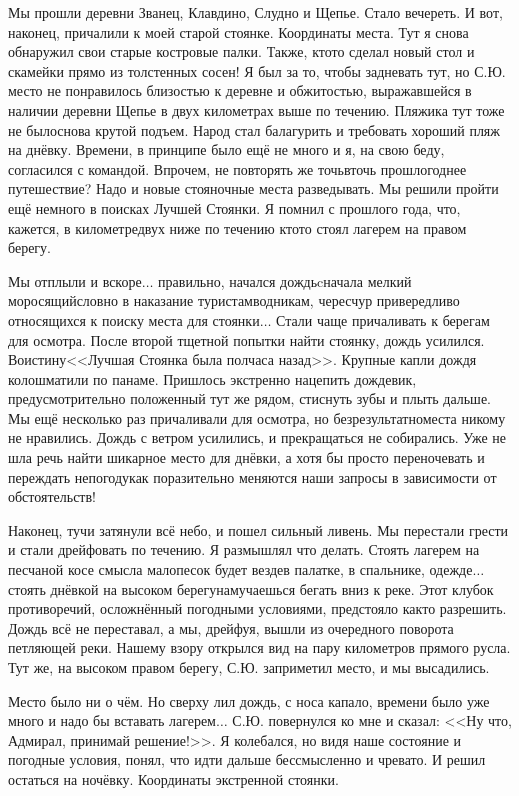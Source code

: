 Мы прошли деревни Званец, Клавдино, Слудно и Щепье. Стало вечереть. И вот, наконец, причалили к моей старой стоянке. Координаты места\mdash \CoordsChagodoschaFifteenSecondDnevka. Тут я снова обнаружил свои старые костровые палки. Также, кто\sdash то сделал новый стол и скамейки прямо из толстенных сосен! Я был за то, чтобы задневать тут, но С.Ю. место не понравилось близостью к деревне и обжитостью, выражавшейся в наличии деревни Щепье в двух километрах выше по течению. Пляжика тут тоже не было\mdash снова крутой подъем. Народ стал балагурить и требовать хороший пляж на днёвку. Времени, в принципе было ещё не много и я, на свою беду, согласился с командой. Впрочем, не повторять же точь\sdash в\sdash точь прошлогоднее путешествие? Надо и новые стояночные места разведывать. Мы решили пройти ещё немного в поисках Лучшей Стоянки. Я помнил с прошлого года, что, кажется, в километре\sdash двух ниже по течению кто\sdash то стоял лагерем на правом берегу.

Мы отплыли и вскоре$\ldots$ правильно, начался дождь\mdash cначала мелкий моросящий\mdash словно в наказание туристам\sdash водникам, чересчур привередливо относящихся к поиску места для стоянки$\ldots$ Стали чаще причаливать к берегам для осмотра. После второй тщетной попытки найти стоянку, дождь усилился. Воистину\mdash <<Лучшая Стоянка была полчаса назад>>. Крупные капли дождя колошматили по панаме. Пришлось экстренно нацепить дождевик, предусмотрительно положенный тут же рядом, стиснуть зубы и плыть дальше. Мы ещё несколько раз причаливали для осмотра, но безрезультатно\mdash места никому не нравились. Дождь с ветром усилились, и прекращаться не собирались. Уже не шла речь найти шикарное место для днёвки, а хотя бы просто переночевать и переждать непогоду\mdash как поразительно меняются наши запросы в зависимости от обстоятельств!

Наконец, тучи затянули всё небо, и пошел сильный ливень. Мы перестали грести и стали дрейфовать по течению. Я размышлял что делать. Стоять лагерем на песчаной косе смысла мало\mdash песок будет везде\mdash в палатке, в спальнике, одежде$\ldots$ стоять днёвкой на высоком берегу\mdash намучаешься бегать вниз к реке. Этот клубок противоречий, осложнённый погодными условиями, предстояло как\sdash то разрешить. Дождь всё не переставал, а мы, дрейфуя, вышли из очередного поворота петляющей реки. Нашему взору открылся вид на пару километров прямого русла. Тут же, на высоком правом берегу, С.Ю. заприметил место, и мы высадились. 

Место было ни о чём. Но сверху лил дождь, с носа капало, времени было уже много и надо бы вставать лагерем$\ldots$ С.Ю. повернулся ко мне и сказал: <<Ну что, Адмирал, принимай решение!>>. Я колебался, но видя наше состояние и погодные условия, понял, что идти дальше бессмысленно и чревато. И решил остаться на ночёвку. Координаты экстренной стоянки\mdash \CoordsChagodoschaSixteenEmergencyNignt.

